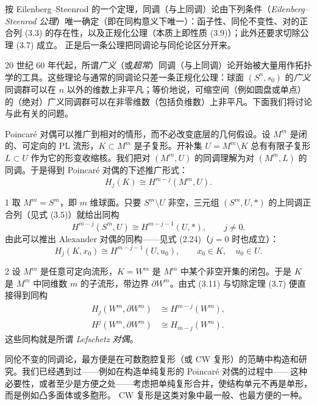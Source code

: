 按 Eilenberg--Steenrod 的一个定理，同调（与上同调）论由下列条件（\emph{Eilenberg--Steenrod 公理}）唯一确定（即在同构意义下唯一）：函子性、同伦不变性、对的正合列 (3.3) 的存在性，以及正规化公理（本质上即性质 (3.9)）；此外还要求切除公理 (3.7) 成立。
正是后一条公理把同调论与同伦论区分开来。

20 世纪 60 年代起，所谓\emph{广义}（或\emph{超常}）同调（与上同调）论开始被大量用作拓扑学的工具。这些理论与通常的同调论只差一条正规化公理：球面 $(S^n,s_0)$ 的\emph{广义}同调群可以在 $n$ 以外的维数上非平凡；等价地说，可缩空间（例如圆盘或单点）的（绝对）广义同调群可以在非零维数（包括负维数）上非平凡。下面我们将讨论与此有关的问题。

Poincaré 对偶可以推广到相对的情形，而不必改变底层的几何假设。设 $M^m$ 是闭的、可定向的 PL 流形，$K\subset M^m$ 是子复形。开补集 $U=M^m\setminus K$ 总有有限子复形 $L\subset U$ 作为它的形变收缩核。我们把对 $(M^m,U)$ 的同调理解为对 $(M^m,L)$ 的同调。于是得到 Poincaré 对偶的下述推广形式：
\begin{equation}
  H_j(K)\cong H^{m-j}(M^m,U). \tag{3.10}
\end{equation}

\begin{example}{1}
取 $M^m=S^m$，即 $m$ 维球面。只要 $S^m\setminus U$ 非空，三元组 $(S^m,U,*)$ 的上同调正合列（见式 (3.5)）就给出同构
\[
  H^{m-j}(S^m,U)\cong H^{m-j-1}(U,*),\qquad j\neq 0.
\]
由此可以推出 Alexander 对偶的同构——见式 (2.24)（$j=0$ 时也成立）：
\begin{equation}
  H_j(K,x_0)\cong H^{m-j-1}(U,u_0),\qquad x_0\in K,\quad u_0\in U. \tag{3.11}
\end{equation}
\end{example}

\begin{example}{2}
设 $M^m$ 是任意可定向流形，$K=W^m$ 是 $M^m$ 中某个非空开集的闭包。于是 $K$ 是 $M^m$ 中同维数 $m$ 的子流形，带边界 $\partial W^m$。由式 (3.11) 与切除定理 (3.7) 便直接得到同构
\[
  \begin{aligned}
    H_j(W^m,\partial W^m)&\cong H^{m-j}(W^m),\\
    H^j(W^m,\partial W^m)&\cong H_{m-j}(W^m).
  \end{aligned}
\]
这些同构就是所谓 \emph{Lefschetz 对偶}。
\end{example}

同伦不变的同调论，最方便是在可数胞腔复形（或 CW 复形）的范畴中构造和研究。我们已经遇到过——例如在构造单纯复形的 Poincaré 对偶的过程中——这种必要性，或者至少是方便之处——考虑把单纯复形合并，使结构单元不再是单形，而是例如凸多面体或多胞形。
CW 复形是这类对象中最一般、也最方便的一种。

